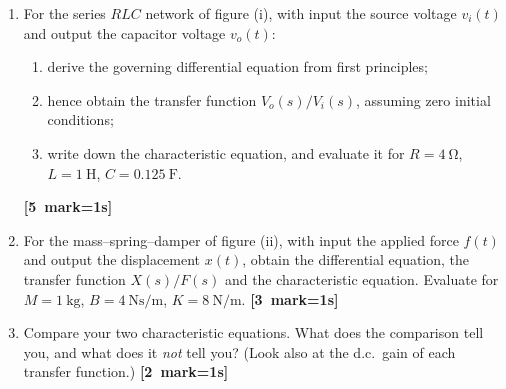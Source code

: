 \documentclass[11pt,a4paper]{article}
\newcommand{\qmarks}[1]{\hfill\mbox{\small\color{fnavy}\textbf{[#1 mark\ifnum#1=1\else s\fi]}}}
\begin{document}
\begin{enumerate}[label=(\alph*)]
\item For the series $RLC$ network of figure (i), with input the source voltage
      $v_{i}(t)$ and output the capacitor voltage $v_{o}(t)$:
      \begin{enumerate}[label=(\roman*)]
      \item derive the governing differential equation from first principles;
      \item hence obtain the transfer function $V_{o}(s)/V_{i}(s)$, assuming
            zero initial conditions;
      \item write down the characteristic equation, and evaluate it for
            $R=\SI{4}{\ohm}$, $L=\SI{1}{\henry}$, $C=\SI{0.125}{\farad}$.
      \end{enumerate}
      \qmarks{5}

\item For the mass--spring--damper of figure (ii), with input the applied force
      $f(t)$ and output the displacement $x(t)$, obtain the differential
      equation, the transfer function $X(s)/F(s)$ and the characteristic
      equation. Evaluate for $M=\SI{1}{\kilogram}$,
      $B=\SI{4}{\newton\second\per\metre}$, $K=\SI{8}{\newton\per\metre}$.
      \qmarks{3}

\item Compare your two characteristic equations. What does the comparison tell
      you, and what does it \emph{not} tell you? (Look also at the d.c.\ gain
      of each transfer function.) \qmarks{2}
\end{enumerate}
\end{document}
